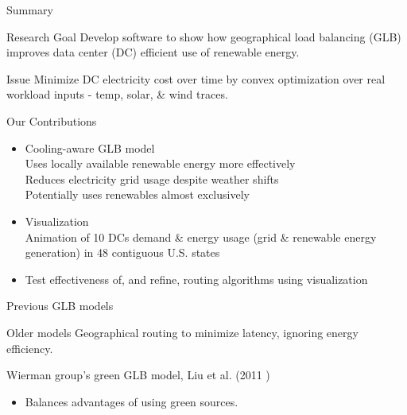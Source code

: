\documentclass[xcolor=dvipsnames]{beamer}
\begin{document}
\begin{frame}{Summary}

	\begin{block}{Research Goal}  
	Develop software to show how geographical load balancing (GLB) improves data center (DC) efficient use of renewable energy.  
	\end{block}
	
	\begin{block}{Issue} 
	Minimize DC electricity cost over time by convex optimization over real workload inputs - temp, solar, \& wind traces.
	\end{block}

	\begin{block}{Our Contributions} 
	\begin{itemize}
		\item{Cooling-aware GLB model \\
			Uses locally available renewable energy more effectively \\
			Reduces electricity grid usage despite weather shifts\\
			Potentially uses renewables almost exclusively} 
		\item{Visualization \\ 
		Animation of 10 DCs demand \& energy usage (grid \& renewable energy generation) in 48 contiguous U.S. states}  
		\item{Test effectiveness of, and refine, routing algorithms using visualization}
	\end{itemize} 
	\end{block}

\end{frame}

\begin{frame}{Previous GLB models}

	\begin{block}{Older models}
		Geographical routing to minimize latency, ignoring energy efficiency.
	\end{block}

	\begin{block}{Wierman group's green GLB model, Liu et al. (2011 )} %
		\begin{itemize}
			\item{Balances advantages of using green sources.}
		\end{itemize}
	\end{block}  	
\end{frame}
\end{document}
